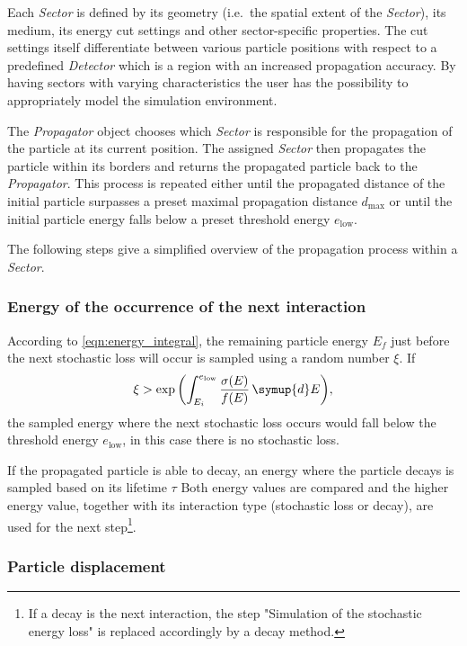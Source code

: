 Each \emph{Sector} is defined by its geometry (i.e.\ the spatial extent of the \emph{Sector}), its medium, its energy cut settings and other sector-specific properties.
The cut settings itself differentiate between various particle positions with respect to a predefined \emph{Detector} which is a region with an increased propagation accuracy.
By having sectors with varying characteristics the user has the possibility to appropriately model the simulation environment.

The \emph{Propagator} object chooses which \emph{Sector} is responsible for the propagation of the particle at its current position.
The assigned \emph{Sector} then propagates the particle within its borders and returns the propagated particle back to the \emph{Propagator}.
This process is repeated either until the propagated distance of the initial particle surpasses a preset maximal propagation distance $d_\text{max}$ or until the initial particle energy falls below a preset threshold energy $e_\text{low}$.

The following steps give a simplified overview of the propagation process within a \emph{Sector}.

\subsubsection{Energy of the occurrence of the next interaction}

According to \eqref{eqn:energy_integral}, the remaining particle energy $E_f$ just before the next stochastic loss will occur is sampled using a random number $\xi$.
If
%
\begin{equation}
	\xi > \exp{\left( \int_{E_i}^{e_\text{low}} \frac{\sigma(E)}{f(E)} \, \symup{d}E \right)},
\end{equation}
%
the sampled energy where the next stochastic loss occurs would fall below the threshold energy $e_\text{low}$, in this case there is no stochastic loss.

If the propagated particle is able to decay, an energy where the particle decays is sampled based on its lifetime $\tau$
Both energy values are compared and the higher energy value, together with its interaction type (stochastic loss or decay), are used for the next step\footnote{If a decay is the next interaction, the step "Simulation of the stochastic energy loss" is replaced accordingly by a decay method.}.

\subsubsection{Particle displacement}

